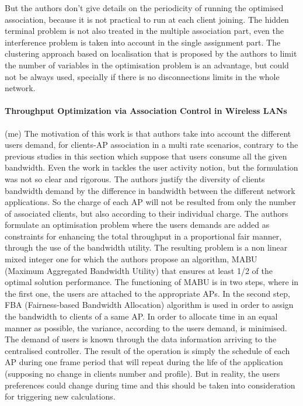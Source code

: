 \documentclass[journal,transmag]{IEEEtran}
\begin{document}
But the authors don't give details on the periodicity of running the optimised association, because it is not practical to run at each client joining. The hidden terminal problem is not also treated in the multiple association part, even the interference problem is taken into account in the single assignment part. The clustering approach based on localisation that is proposed by the authors to limit the number of variables in the optimisation problem is an  advantage, but could not be always used, specially if there is no disconnections limits in the whole network. \\ 

\paragraph{Throughput Optimization via Association Control in Wireless LANs \cite{15Demand_aware_load_balance_WLAN,16throughput_optimisation_association_bandwidth}} (me) 
The motivation of this work is that authors take into account the different users demand, for clients-AP association in a multi rate scenarios, contrary to the previous studies in this section which suppose that users consume all the given bandwidth. Even the work in \cite{07optimal_association_MSWIM} tackles the user activity notion, but the formulation was not so clear and rigorous. The authors justify the diversity of clients bandwidth demand by the difference in bandwidth between the different network applications. So the charge of each AP will not be resulted from only the number of associated clients, but also according to their individual charge. The authors formulate an optimisation problem where the users demands are added as constraints for enhancing the total throughput in a proportional fair manner, through the use of the bandwidth utility. The resulting problem is a non linear mixed integer one for which the authors propose an algorithm, MABU (Maximum Aggregated Bandwidth Utility) that ensures at least 1/2 of the optimal solution performance. The functioning of MABU is in two steps, where in the first one, the users are attached to the appropriate APs. In the second step, FBA (Fairness-based Bandwidth Allocation) algorithm is used in order to assign the bandwidth to clients of a same AP. In order to allocate time in an equal manner as possible, the variance, according to the users demand, is minimised. The demand of users is known through the data information arriving to the centralised controller. The result of the operation is simply the schedule of each AP during one frame period that will repeat during the life of the application (supposing no change in clients number and profile). But in reality, the users preferences could change during time and this should be taken into consideration for triggering new calculations. \\         
\end{document}
